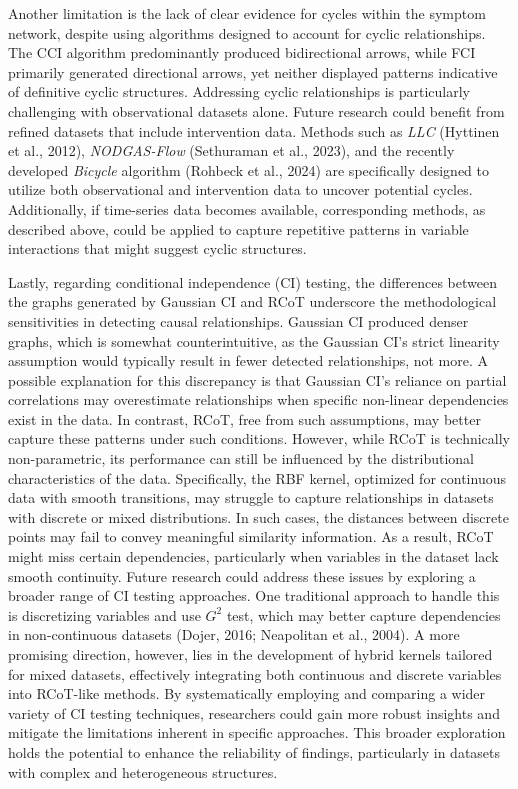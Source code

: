 \documentclass[
]{article}
\begin{document}
Another limitation is the lack of clear evidence for cycles within the
symptom network, despite using algorithms designed to account for cyclic
relationships. The CCI algorithm predominantly produced bidirectional
arrows, while FCI primarily generated directional arrows, yet neither
displayed patterns indicative of definitive cyclic structures.
Addressing cyclic relationships is particularly challenging with
observational datasets alone. Future research could benefit from refined
datasets that include intervention data. Methods such as \emph{LLC}
(Hyttinen et al., 2012), \emph{NODGAS-Flow} (Sethuraman et al., 2023),
and the recently developed \emph{Bicycle} algorithm (Rohbeck et al.,
2024) are specifically designed to utilize both observational and
intervention data to uncover potential cycles. Additionally, if
time-series data becomes available, corresponding methods, as described
above, could be applied to capture repetitive patterns in variable
interactions that might suggest cyclic structures.

Lastly, regarding conditional independence (CI) testing, the differences
between the graphs generated by Gaussian CI and RCoT underscore the
methodological sensitivities in detecting causal relationships. Gaussian
CI produced denser graphs, which is somewhat counterintuitive, as the
Gaussian CI's strict linearity assumption would typically result in
fewer detected relationships, not more. A possible explanation for this
discrepancy is that Gaussian CI's reliance on partial correlations may
overestimate relationships when specific non-linear dependencies exist
in the data. In contrast, RCoT, free from such assumptions, may better
capture these patterns under such conditions. However, while RCoT is
technically non-parametric, its performance can still be influenced by
the distributional characteristics of the data. Specifically, the RBF
kernel, optimized for continuous data with smooth transitions, may
struggle to capture relationships in datasets with discrete or mixed
distributions. In such cases, the distances between discrete points may
fail to convey meaningful similarity information. As a result, RCoT
might miss certain dependencies, particularly when variables in the
dataset lack smooth continuity. Future research could address these
issues by exploring a broader range of CI testing approaches. One
traditional approach to handle this is discretizing variables and use
\(G^2\) test, which may better capture dependencies in non-continuous
datasets (Dojer, 2016; Neapolitan et al., 2004). A more promising
direction, however, lies in the development of hybrid kernels tailored
for mixed datasets, effectively integrating both continuous and discrete
variables into RCoT-like methods. By systematically employing and
comparing a wider variety of CI testing techniques, researchers could
gain more robust insights and mitigate the limitations inherent in
specific approaches. This broader exploration holds the potential to
enhance the reliability of findings, particularly in datasets with
complex and heterogeneous structures.
\end{document}
